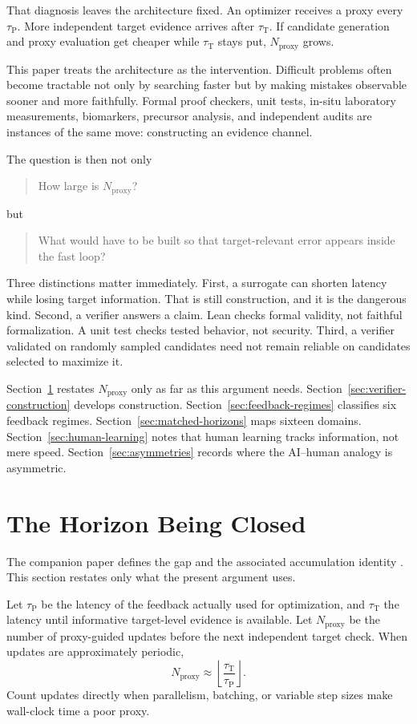 \documentclass[11pt]{article}
\newcommand{\tauP}{\tau_{\mathrm{P}}}
\newcommand{\tauT}{\tau_{\mathrm{T}}}
\newcommand{\Nproxy}{N_{\mathrm{proxy}}}
\begin{document}
That diagnosis leaves the architecture fixed. An optimizer receives a proxy every \(\tauP\). More independent target evidence arrives after \(\tauT\). If candidate generation and proxy evaluation get cheaper while \(\tauT\) stays put, \(\Nproxy\) grows.

This paper treats the architecture as the intervention. Difficult problems often become tractable not only by searching faster but by making mistakes observable sooner and more faithfully. Formal proof checkers, unit tests, in-situ laboratory measurements, biomarkers, precursor analysis, and independent audits are instances of the same move: constructing an evidence channel.

The question is then not only
\begin{quote}
How large is \(\Nproxy\)?
\end{quote}
but
\begin{quote}
What would have to be built so that target-relevant error appears inside the fast loop?
\end{quote}

Three distinctions matter immediately. First, a surrogate can shorten latency while losing target information. That is still construction, and it is the dangerous kind. Second, a verifier answers a claim. Lean checks formal validity, not faithful formalization. A unit test checks tested behavior, not security. Third, a verifier validated on randomly sampled candidates need not remain reliable on candidates selected to maximize it.

Section~\ref{sec:horizon-recap} restates \(\Nproxy\) only as far as this argument needs. Section~\ref{sec:verifier-construction} develops construction. Section~\ref{sec:feedback-regimes} classifies six feedback regimes. Section~\ref{sec:matched-horizons} maps sixteen domains. Section~\ref{sec:human-learning} notes that human learning tracks information, not mere speed. Section~\ref{sec:asymmetries} records where the AI--human analogy is asymmetric.

\section{The Horizon Being Closed}
\label{sec:horizon-recap}

The companion paper defines the gap and the associated accumulation identity \parencite{zarncke2026feedbackhorizon}. This section restates only what the present argument uses.

Let \(\tauP\) be the latency of the feedback actually used for optimization, and \(\tauT\) the latency until informative target-level evidence is available. Let \(\Nproxy\) be the number of proxy-guided updates before the next independent target check. When updates are approximately periodic,
\[
\Nproxy \approx \left\lfloor \frac{\tauT}{\tauP} \right\rfloor.
\]
Count updates directly when parallelism, batching, or variable step sizes make wall-clock time a poor proxy.
\end{document}
